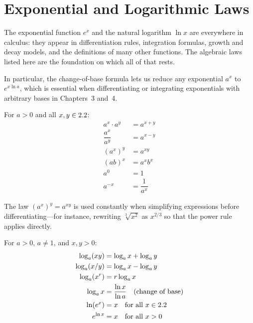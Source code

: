 \section{Exponential and Logarithmic Laws}
\label{sec:A.2}

The exponential function $e^x$ and the natural logarithm $\ln x$ are
everywhere in calculus: they appear in differentiation rules, integration
formulas, growth and decay models, and the definitions of many other
functions. The algebraic laws listed here are the foundation on which all
of that rests.

In particular, the change-of-base formula lets us reduce any exponential
$a^x$ to $e^{x \ln a}$, which is essential when differentiating or
integrating exponentials with arbitrary bases in Chapters~3 and~4.

\begin{proposition}\label{prop:A-8}
For $a > 0$ and all $x, y \in 2.2$:
\begin{align*}
  a^x \cdot a^y    &= a^{x+y} \\
  \dfrac{a^x}{a^y} &= a^{x-y} \\
  (a^x)^y          &= a^{xy} \\
  (ab)^x           &= a^x b^x \\
  a^0              &= 1 \\
  a^{-x}           &= \dfrac{1}{a^x}
\end{align*}
\end{proposition}

\begin{remark}
The law $(a^x)^y = a^{xy}$ is used constantly when simplifying
expressions before differentiating---for instance, rewriting
$\sqrt[3]{x^2}$ as $x^{2/3}$ so that the power rule applies directly.
\end{remark}

\begin{proposition}\label{prop:A-9}
For $a > 0$, $a \neq 1$, and $x, y > 0$:
\begin{align*}
  \log_a(xy)  &= \log_a x + \log_a y \\
  \log_a(x/y) &= \log_a x - \log_a y \\
  \log_a(x^r) &= r\log_a x \\
  \log_a x    &= \dfrac{\ln x}{\ln a}
                 \quad \text{(change of base)} \\
  \ln(e^x)    &= x \quad \text{for all } x \in 2.2 \\
  e^{\ln x}   &= x \quad \text{for all } x > 0
\end{align*}
\end{proposition}

